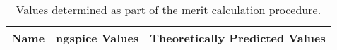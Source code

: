 \begin{table}[H]
  \centering
  \begin{tabular}{|c|c|c|}
    \hline    
    {\bf Name} & {\bf ngspice Values} & {\bf Theoretically Predicted Values} \\ \hline
    
  \end{tabular}
  \caption{Values determined as part of the merit calculation procedure.}
  \label{tab:merit}
\end{table}

